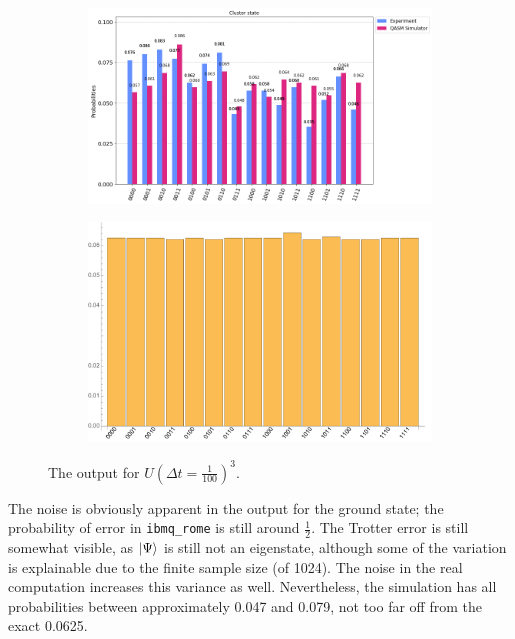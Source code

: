 \documentclass[10pt]{amsart}
\theoremstyle{definition}
\begin{document}
\begin{figure}[hbt]
    \begin{subfigure}{0.4\textwidth}
    \centering
    \includegraphics[width=0.9\linewidth]{smallt_inputClust_quantum.png}
  \end{subfigure}
  \begin{subfigure}{0.4\textwidth}
    \centering
    \includegraphics[width=0.9\linewidth]{smallt_inputClust_exact}
  \end{subfigure}
  \caption{The output for $U(\Delta t = \frac{1}{100})^3$.}
  \label{fig:smallt}
\end{figure}

The noise is obviously apparent in the output for the ground state; the
probability of error in \texttt{ibmq\_rome} is still around $\frac12$. The
Trotter error is still somewhat visible, as $\ket{\Psi}$ is still not an
eigenstate, although some of the variation is explainable due to the finite
sample size (of 1024). The noise in the real computation increases this
variance as well. Nevertheless, the simulation has all probabilities between
approximately 0.047 and 0.079, not too far off from the exact 0.0625.
\end{document}
